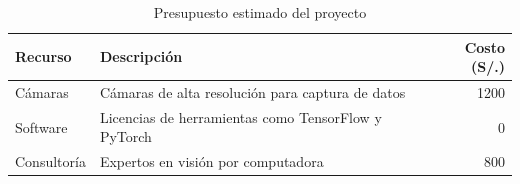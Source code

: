 \begin{table}[H]
\centering
\caption{Presupuesto estimado del proyecto}
\label{table:presupuesto}
\begin{tabular}{|l|p{7cm}|r|}
\hline
\textbf{Recurso} & \textbf{Descripción} & \textbf{Costo (S/.)} \\ \hline
Cámaras & Cámaras de alta resolución para captura de datos & 1200 \\ \hline
Software & Licencias de herramientas como TensorFlow y PyTorch & 0 \\ \hline
Consultoría & Expertos en visión por computadora & 800 \\ \hline
\end{tabular}
\end{table}





